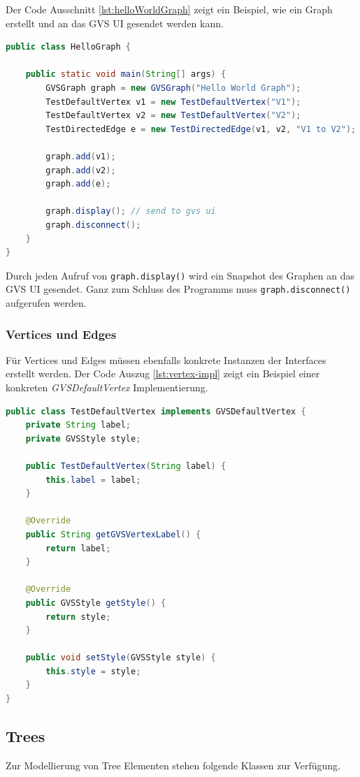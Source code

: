 \documentclass[11pt,a4paper,english,oneside]{book}
\numberwithin{equation}{chapter}
\begin{document}
	\clearpage
	\noindent
	Der Code Ausschnitt \ref{lst:helloWorldGraph} zeigt ein Beispiel, wie ein Graph erstellt und an das GVS UI gesendet werden kann.
\begin{lstlisting}[language=java, frame=single, caption={Hello World Graph}, label={lst:helloWorldGraph}]
public class HelloGraph {

	public static void main(String[] args) {
		GVSGraph graph = new GVSGraph("Hello World Graph");
		TestDefaultVertex v1 = new TestDefaultVertex("V1");
		TestDefaultVertex v2 = new TestDefaultVertex("V2");
		TestDirectedEdge e = new TestDirectedEdge(v1, v2, "V1 to V2");
		
		graph.add(v1);
		graph.add(v2);
		graph.add(e);
		
		graph.display(); // send to gvs ui
		graph.disconnect();
	}
}
\end{lstlisting}	
	
	\noindent
	Durch jeden Aufruf von \lstinline{graph.display()} wird ein Snapshot des Graphen an das GVS UI gesendet. Ganz zum Schluss des Programms muss \lstinline{graph.disconnect()} aufgerufen werden.
	
	\subsubsection{Vertices und Edges}
	Für Vertices und Edges müssen ebenfalls konkrete Instanzen der Interfaces erstellt werden. Der Code Auszug \ref{lst:vertex-impl} zeigt ein Beispiel einer konkreten \textit{GVSDefaultVertex} Implementierung.
	
\begin{lstlisting}[language=java, frame=single, caption={DefaultVertex Implementierung}, label={lst:vertex-impl}]
public class TestDefaultVertex implements GVSDefaultVertex {
	private String label;
	private GVSStyle style;
	
	public TestDefaultVertex(String label) {
		this.label = label;
	}
	
	@Override
	public String getGVSVertexLabel() {
		return label;
	}
	
	@Override
	public GVSStyle getStyle() {
		return style;
	}
	
	public void setStyle(GVSStyle style) {
		this.style = style;
	}
}
\end{lstlisting}

	\clearpage
	
	\subsection{Trees}
	Zur Modellierung von Tree Elementen stehen folgende Klassen zur Verfügung.
	
\end{document}
